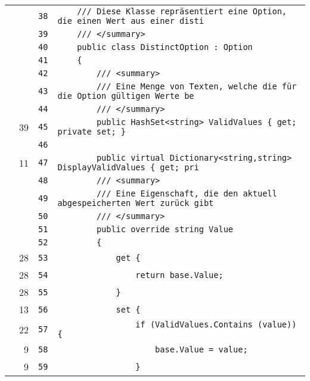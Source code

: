 \documentclass[a4paper,10pt]{article}
\begin{document}
\begin{longtable}[l]{lrrl}
\cellcolor{gray} &  & \verb~38~ & \verb~    /// Diese Klasse repräsentiert eine Option, die einen Wert aus einer disti~\\
\cellcolor{gray} &  & \verb~39~ & \verb~    /// </summary>~\\
\cellcolor{gray} &  & \verb~40~ & \verb~    public class DistinctOption : Option~\\
\cellcolor{gray} &  & \verb~41~ & \verb~    {~\\
\cellcolor{gray} &  & \verb~42~ & \verb~        /// <summary>~\\
\cellcolor{gray} &  & \verb~43~ & \verb~        /// Eine Menge von Texten, welche die für die Option gültigen Werte be~\\
\cellcolor{gray} &  & \verb~44~ & \verb~        /// </summary>~\\
\cellcolor{green} & 39 & \verb~45~ & \verb~        public HashSet<string> ValidValues { get; private set; }~\\
\cellcolor{gray} &  & \verb~46~ & \verb~~\\
\cellcolor{green} & 11 & \verb~47~ & \verb~        public virtual Dictionary<string,string> DisplayValidValues { get; pri~\\
\cellcolor{gray} &  & \verb~48~ & \verb~        /// <summary>~\\
\cellcolor{gray} &  & \verb~49~ & \verb~        /// Eine Eigenschaft, die den aktuell abgespeicherten Wert zurück gibt~\\
\cellcolor{gray} &  & \verb~50~ & \verb~        /// </summary>~\\
\cellcolor{gray} &  & \verb~51~ & \verb~        public override string Value~\\
\cellcolor{gray} &  & \verb~52~ & \verb~        {~\\
\cellcolor{green} & 28 & \verb~53~ & \verb~            get {~\\
\cellcolor{green} & 28 & \verb~54~ & \verb~                return base.Value;~\\
\cellcolor{green} & 28 & \verb~55~ & \verb~            }~\\
\cellcolor{green} & 13 & \verb~56~ & \verb~            set {~\\
\cellcolor{green} & 22 & \verb~57~ & \verb~                if (ValidValues.Contains (value)) {~\\
\cellcolor{green} & 9 & \verb~58~ & \verb~                    base.Value = value;~\\
\cellcolor{green} & 9 & \verb~59~ & \verb~                }~\\

\end{longtable}
\end{document}
